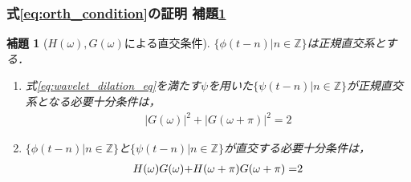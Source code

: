 \documentclass[dvipdfmx,graphicx,14pt]{beamer}
\newcommand{\roverline}[1]{\mathpalette\doroverline{#1}}
\newcommand{\doroverline}[2]{\overline{#1#2}}
\newtheorem{mylemma}{補題}
\begin{document}
\begin{frame}[c]
    \frametitle{式\eqref{eq:orth_condition}の証明 補題\ref{lem:scale_wavelet_orth_condition_in_freq}}
    \begin{mylemma}[$H(\omega),G(\omega)$による直交条件]
        $\{ \phi(t - n) | n \in \mathbb{Z} \}$は正規直交系とする．
        \label{lem:scale_wavelet_orth_condition_in_freq}
        \begin{enumerate}
            \item 式\eqref{eq:wavelet_dilation_eq}を満たす$\psi$を用いた$\{ \psi(t - n) | n \in \mathbb{Z} \}$が正規直交系となる必要十分条件は，
                \begin{align}
                    |G(\omega)|^{2} + |G(\omega+\pi)|^{2} = 2 \label{eq:wavelet_orth_condition_in_freq}
                \end{align}
            \item $\{ \phi(t - n) | n \in \mathbb{Z} \}$と$\{ \psi(t - n) | n \in \mathbb{Z} \}$が直交する必要十分条件は，
                \begin{align}
                    H(\omega)\roverline{G(\omega)} + H(\omega+\pi)\roverline{G(\omega+\pi)} = 2 \label{eq:scale_wavelet_orth_condition_in_freq}
                \end{align}
        \end{enumerate}
    \end{mylemma}
\end{frame}
\end{document}
